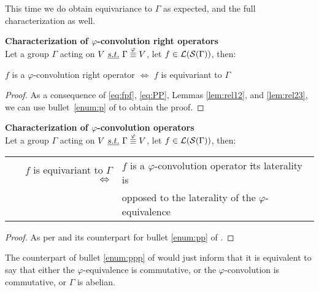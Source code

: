 This time we do obtain equivariance to $\Gamma$ as expected, and the full characterization as well.

\begin{theorem}\textbf{Characterization of $\varphi$-convolution right operators}\\
Let a group $\Gamma$ acting on $V~\emph{s.t.}~ \Gamma \overset{\varphi}{\equiv} V$, let $f \in \mathcal{L}(\mathcal{S}(\Gamma))$, then:\\
\centerline{$f$ is a $\varphi$-convolution right operator $\Leftrightarrow$ $f$ is equivariant to $\Gamma$}
\label{prop:equiG}
\end{theorem}
\begin{proof}
As a consequence of \eqref{eq:fpf}, \eqref{eq:PP}, Lemmas \ref{lem:rel12}, and \ref{lem:rel23}, we can use bullet~\ref{enum:p} of  to obtain the proof.
\end{proof}

\begin{corollary}\textbf{Characterization of $\varphi$-convolution operators}\\
Let a group $\Gamma$ acting on $V~\emph{s.t.}~ \Gamma \overset{\varphi}{\equiv} V$, let $f \in \mathcal{L}(\mathcal{S}(\Gamma))$, then:\\
\begin{tabular}{rl}
  $f$ is equivariant to $\Gamma$ $\Leftrightarrow$ &
  $f$ is a $\varphi$-convolution operator \st its laterality is \\
  & opposed to the laterality of the $\varphi$-equivalence
\end{tabular}
\label{cor:equiG}
\end{corollary}
\begin{proof}
As per  and its counterpart for bullet \ref{enum:pp} of .
\end{proof}

\begin{remark}
The counterpart of bullet \ref{enum:ppp} of  would just inform that it is equivalent to say that either the $\varphi$-equivalence is commutative, or the $\varphi$-convolution is commutative, or $\Gamma$ is abelian.
\end{remark}


